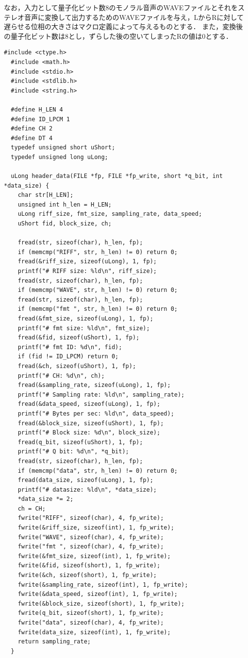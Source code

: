 \documentclass[titlepage]{jarticle}
\begin{document}
なお，入力として量子化ビット数8のモノラル音声のWAVEファイルとそれをステレオ音声に変換して出力するためのWAVEファイルを与え，LからRに対して遅らせる位相の大きさはマクロ定義によって与えるものとする．
また，変換後の量子化ビット数は8とし，ずらした後の空いてしまったRの値は0とする．
\begin{lstlisting}[caption=発展課題,label=final_task.c]
  #include <ctype.h>
  #include <math.h>
  #include <stdio.h>
  #include <stdlib.h>
  #include <string.h>
  
  #define H_LEN 4 
  #define ID_LPCM 1 
  #define CH 2 
  #define DT 4 
  typedef unsigned short uShort;
  typedef unsigned long uLong;

  uLong header_data(FILE *fp, FILE *fp_write, short *q_bit, int *data_size) {
    char str[H_LEN];
    unsigned int h_len = H_LEN;
    uLong riff_size, fmt_size, sampling_rate, data_speed;
    uShort fid, block_size, ch;
  
    fread(str, sizeof(char), h_len, fp);
    if (memcmp("RIFF", str, h_len) != 0) return 0;
    fread(&riff_size, sizeof(uLong), 1, fp);
    printf("# RIFF size: %ld\n", riff_size);
    fread(str, sizeof(char), h_len, fp);
    if (memcmp("WAVE", str, h_len) != 0) return 0;
    fread(str, sizeof(char), h_len, fp);
    if (memcmp("fmt ", str, h_len) != 0) return 0;
    fread(&fmt_size, sizeof(uLong), 1, fp);
    printf("# fmt size: %ld\n", fmt_size);
    fread(&fid, sizeof(uShort), 1, fp);
    printf("# fmt ID: %d\n", fid);
    if (fid != ID_LPCM) return 0;
    fread(&ch, sizeof(uShort), 1, fp);
    printf("# CH: %d\n", ch);
    fread(&sampling_rate, sizeof(uLong), 1, fp);
    printf("# Sampling rate: %ld\n", sampling_rate);
    fread(&data_speed, sizeof(uLong), 1, fp);
    printf("# Bytes per sec: %ld\n", data_speed);
    fread(&block_size, sizeof(uShort), 1, fp);
    printf("# Block size: %d\n", block_size);
    fread(q_bit, sizeof(uShort), 1, fp);
    printf("# Q bit: %d\n", *q_bit);
    fread(str, sizeof(char), h_len, fp);
    if (memcmp("data", str, h_len) != 0) return 0;
    fread(data_size, sizeof(uLong), 1, fp);
    printf("# datasize: %ld\n", *data_size);
    *data_size *= 2;
    ch = CH;
    fwrite("RIFF", sizeof(char), 4, fp_write);
    fwrite(&riff_size, sizeof(int), 1, fp_write);
    fwrite("WAVE", sizeof(char), 4, fp_write);
    fwrite("fmt ", sizeof(char), 4, fp_write);
    fwrite(&fmt_size, sizeof(int), 1, fp_write);
    fwrite(&fid, sizeof(short), 1, fp_write);
    fwrite(&ch, sizeof(short), 1, fp_write);
    fwrite(&sampling_rate, sizeof(int), 1, fp_write);
    fwrite(&data_speed, sizeof(int), 1, fp_write);
    fwrite(&block_size, sizeof(short), 1, fp_write);
    fwrite(q_bit, sizeof(short), 1, fp_write);
    fwrite("data", sizeof(char), 4, fp_write);
    fwrite(data_size, sizeof(int), 1, fp_write);
    return sampling_rate;
  }
  

\end{lstlisting}
\end{document}
